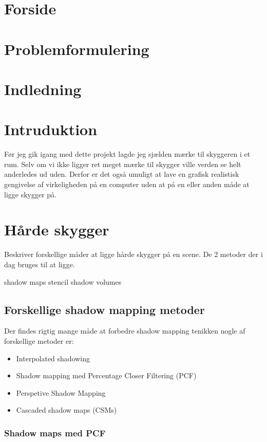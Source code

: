 \documentclass[11pt,a4paper]{article}
\begin{document}
\section{Forside}

\section{Problemformulering}


\section{Indledning}


\section{Intruduktion}
Før jeg gik igang med dette projekt lagde jeg sjælden mærke til skyggeren i et rum. Selv om vi ikke ligger ret meget mærke til skygger ville verden se helt anderledes ud uden. Derfor er det også umuligt at lave en grafisk realistisk gengivelse af virkeligheden på en computer uden at på en eller anden måde at ligge skygger på.

\section{Hårde skygger}
Beskriver forskellige måder at ligge hårde skygger på en scene. De 2 metoder der i dag bruges til at ligge.

shadow maps
stencil shadow volumes

\subsection{Forskellige shadow mapping metoder}

Der findes rigtig mange måde at forbedre shadow mapping tenikken nogle af forskellige metoder er:

\begin{itemize}
  \item Interpolated shadowing
  \item Shadow mapping med Percentage Closer Filtering (PCF)
  \item Perspetive Shadow Mapping
  \item Cascaded shadow maps (CSMs)
\end{itemize}


\subsubsection{Shadow maps med PCF}
\end{document}
